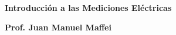 \thispagestyle{empty}

\begin{center}

\vspace*{\fill}

\textbf{\color{verde_UnB}\fontsize{30pt}{35pt}\selectfont \textbf{Introducción a las Mediciones Eléctricas}}

\vfill

{\textbf{\fontsize{13pt}{15.6pt}\selectfont \centering  Prof. Juan Manuel Maffei}}



\vspace*{\fill}

\end{center}

\newpage